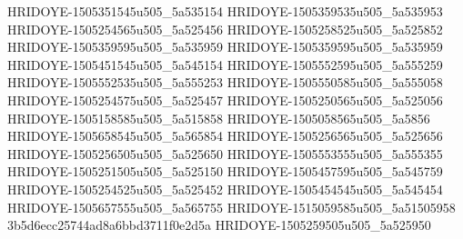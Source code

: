 HRIDOYE-1505351545u505_5a535154
HRIDOYE-1505359535u505_5a535953
HRIDOYE-1505254565u505_5a525456
HRIDOYE-1505258525u505_5a525852
HRIDOYE-1505359595u505_5a535959
HRIDOYE-1505359595u505_5a535959
HRIDOYE-1505451545u505_5a545154
HRIDOYE-1505552595u505_5a555259
HRIDOYE-1505552535u505_5a555253
HRIDOYE-1505550585u505_5a555058
HRIDOYE-1505254575u505_5a525457
HRIDOYE-1505250565u505_5a525056
HRIDOYE-1505158585u505_5a515858
HRIDOYE-1505058565u505_5a5856
HRIDOYE-1505658545u505_5a565854
HRIDOYE-1505256565u505_5a525656
HRIDOYE-1505256505u505_5a525650
HRIDOYE-1505553555u505_5a555355
HRIDOYE-1505251505u505_5a525150
HRIDOYE-1505457595u505_5a545759
HRIDOYE-1505254525u505_5a525452
HRIDOYE-1505454545u505_5a545454
HRIDOYE-1505657555u505_5a565755
HRIDOYE-1515059585u505_5a51505958
3b5d6ecc25744ad8a6bbd3711f0e2d5a
HRIDOYE-1505259505u505_5a525950
